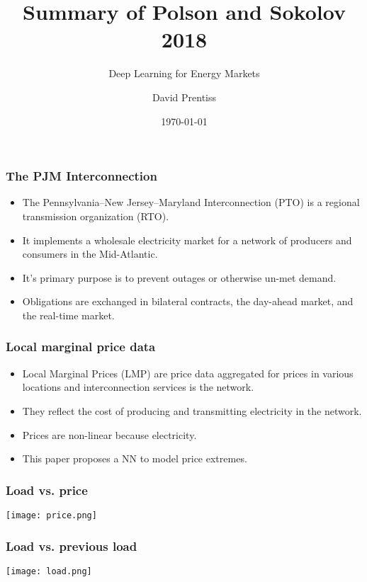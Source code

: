 \documentclass{beamer}
\begin{document}
\title{Summary of Polson and Sokolov 2018}
\subtitle{Deep Learning for Energy Markets}
\author{David Prentiss}
\date{\today}

\frame{\titlepage}

\begin{frame}
  \frametitle{The PJM Interconnection}
  \begin{itemize}
 \item The Pennsylvania--New Jersey--Maryland Interconnection (PTO) is a regional transmission organization (RTO).
    \item It implements a wholesale electricity market for a network of producers and consumers in the Mid-Atlantic.
      \item It's primary purpose is to prevent outages or otherwise un-met demand.
        \item Obligations are exchanged in bilateral contracts, the day-ahead market,
          and the real-time market.
  \end{itemize}
\end{frame}

\begin{frame}
  \frametitle{Local marginal price data}
  \begin{itemize}
  \item Local Marginal Prices (LMP) are price data aggregated for prices in various
  locations and interconnection services is the network.
  \item They reflect the cost of producing and transmitting electricity in the network.
    \item Prices are non-linear because electricity.
      \item This paper proposes a NN to model price extremes.
  \end{itemize}
\end{frame}

\begin{frame}
  \frametitle{Load vs. price}
  \texttt{[image: price.png]}
\end{frame}

\begin{frame}
  \frametitle{Load vs. previous load}
  \texttt{[image: load.png]}
\end{frame}
\end{document}
